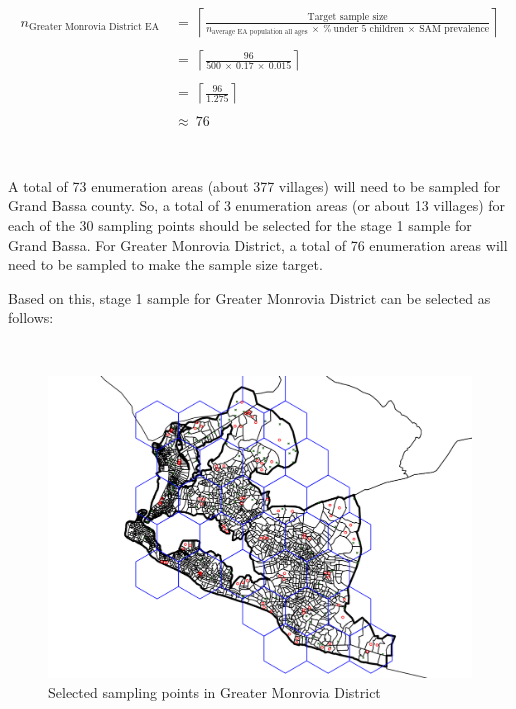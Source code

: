 \documentclass[12pt,a4paper]{book}
\theoremstyle{definition}
\theoremstyle{definition}
\theoremstyle{definition}
\theoremstyle{remark}
\begin{document}
\newpage

\[\begin{aligned} 
n_{\text{Greater Monrovia District EA}} & ~ = ~ \left \lceil \frac{\text{Target sample size}}{n_{\text{average EA population all ages}} ~ \times ~ \% ~ \text{under 5 children} ~ \times ~ \text{SAM prevalence}} \right \rceil \\
\\
& ~ = ~ \left \lceil \frac{96}{500 ~ \times ~ 0.17 ~ \times ~ 0.015} \right \rceil \\
\\
& ~ = ~ \left \lceil \frac{96}{1.275} \right \rceil \\
\\
& ~ \approx ~ 76
\end{aligned}\]

~

A total of 73 enumeration areas (about 377 villages) will need to be
sampled for Grand Bassa county. So, a total of 3 enumeration areas (or
about 13 villages) for each of the 30 sampling points should be selected
for the stage 1 sample for Grand Bassa. For Greater Monrovia District, a
total of 76 enumeration areas will need to be sampled to make the sample
size target.

Based on this, stage 1 sample for Greater Monrovia District can be
selected as follows:

~

\begin{figure}[H]

\includegraphics{figures/sample24-1} \hfill{}

\caption{Selected sampling points in Greater Monrovia District}\label{fig:sample24}
\end{figure}
\end{document}

